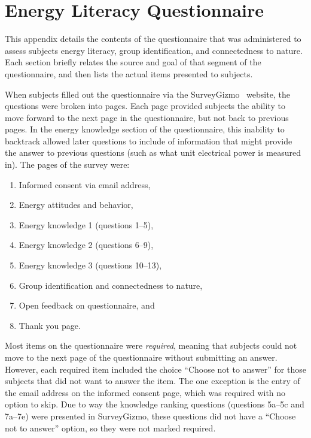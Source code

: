 \chapter{Energy Literacy Questionnaire}
\label{app:energy-literacy}

This appendix details the contents of the questionnaire that was administered to assess subjects energy literacy, group identification, and connectedness to nature. Each section briefly relates the source and goal of that segment of the questionnaire, and then lists the actual items presented to subjects.

When subjects filled out the questionnaire via the SurveyGizmo~\cite{surveygizmo} website, the questions were broken into pages. Each page provided subjects the ability to move forward to the next page in the questionnaire, but not back to previous pages. In the energy knowledge section of the questionnaire, this inability to backtrack allowed later questions to include of information that might provide the answer to previous questions (such as what unit electrical power is measured in). The pages of the survey were:

\begin{enumerate}
	\item Informed consent via email address,
	\item Energy attitudes and behavior,
	\item Energy knowledge 1 (questions 1--5),
	\item Energy knowledge 2 (questions 6--9),
	\item Energy knowledge 3 (questions 10--13),
	\item Group identification and connectedness to nature,
	\item Open feedback on questionnaire, and
	\item Thank you page.
\end{enumerate}

Most items on the questionnaire were \emph{required}, meaning that subjects could not move to the next page of the questionnaire without submitting an answer. However, each required item included the choice ``Choose not to answer'' for those subjects that did not want to answer the item. The one exception is the entry of the email address on the informed consent page, which was required with no option to skip. Due to way the knowledge ranking questions (questions 5a--5c and 7a--7e) were presented in SurveyGizmo, these questions did not have a ``Choose not to answer'' option, so they were not marked required.

